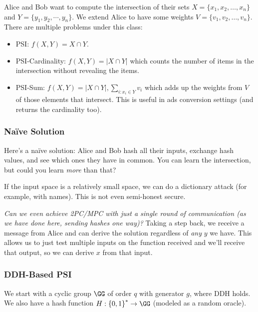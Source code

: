 
Alice and Bob want to compute the intersection of their sets $X = \{x_1, x_2, \dots, x_n\}$ and $Y = \{y_1, y_2, \cdots, y_n\}$. We extend Alice to have some weights $V = \{v_1, v_2, \dots, v_n\}$. There are multiple problems under this class:
\begin{itemize}
    \item PSI: $f(X, Y) = X\cap Y$.
    \item PSI-Cardinality: $f(X, Y) = |X\cap Y|$ which counts the number of items in the intersection without revealing the items.
    \item PSI-Sum: $f(X, Y) = |X\cap Y|, \sum_{i: x_i\in Y}v_i$ which adds up the weights from $V$ of those elements that intersect. This is useful in ads conversion settings (and returns the cardinality too).
\end{itemize}

\subsubsection{Na\"ive Solution}
Here's a na\"ive solution: Alice and Bob hash all their inputs, exchange hash values, and see which ones they have in common. You can learn the intersection, but could you learn \emph{more} than that?


If the input space is a relatively small space, we can do a dictionary attack (for example, with names). This is not even semi-honest secure.

\emph{Can we even achieve 2PC/MPC with just a single round of communication (as we have done here, sending hashes one way)?} Taking a step back, we receive a message from Alice and can derive the solution regardless of \emph{any} $y$ we have. This allows us to just test multiple inputs on the function received and we'll receive that output, so we can derive $x$ from that input.

\subsubsection{DDH-Based PSI}\label{sec:apr04-psi-ddh}
We start with a cyclic group $\GG$ of order $q$ with generator $g$, where DDH holds. We also have a hash function $H: \left\{ 0, 1 \right\}^{*}\to \GG$ (modeled as a random oracle).


